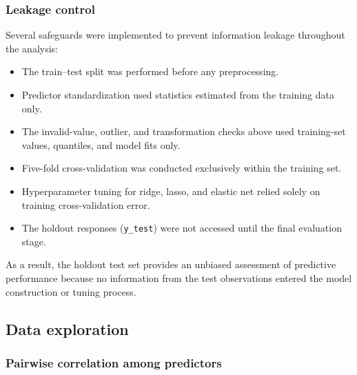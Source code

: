 \documentclass[
  11pt,
]{article}
\providecommand{\tightlist}{%
  \setlength{\itemsep}{0pt}\setlength{\parskip}{0pt}}
\begin{document}
\subsubsection{Leakage control}\label{leakage-control}

Several safeguards were implemented to prevent information leakage
throughout the analysis:

\begin{itemize}
\tightlist
\item
  The train--test split was performed before any preprocessing.
\item
  Predictor standardization used statistics estimated from the training
  data only.
\item
  The invalid-value, outlier, and transformation checks above used
  training-set values, quantiles, and model fits only.
\item
  Five-fold cross-validation was conducted exclusively within the
  training set.
\item
  Hyperparameter tuning for ridge, lasso, and elastic net relied solely
  on training cross-validation error.
\item
  The holdout responses (\texttt{y\_test}) were not accessed until the
  final evaluation stage.
\end{itemize}

As a result, the holdout test set provides an unbiased assessment of
predictive performance because no information from the test observations
entered the model construction or tuning process.

\subsection{Data exploration}\label{data-exploration}

\subsubsection{Pairwise correlation among
predictors}\label{pairwise-correlation-among-predictors}
\end{document}
